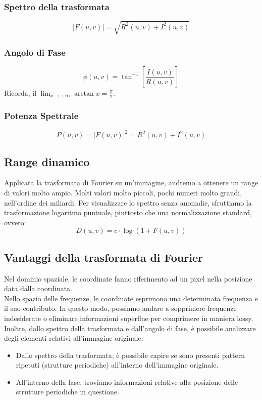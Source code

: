 \documentclass{report}
\begin{document}
	\subsubsection{Spettro della trasformata}
	$$
	|F(u,v)| = \sqrt{R^2(u,v)+I^2(u,v)}
	$$
	\subsubsection{Angolo di Fase}
	$$
	\phi(u,v) = \tan^{-1}\left[\frac{I(u,v)}{R(u,v)}\right]
	$$
	Ricorda, il $\lim_{x \to +\infty} \arctan{x}= \frac{\pi}{2}$.
	\subsubsection{Potenza Spettrale}
	$$
	P(u,v) = |F(u,v)|^2 = R^2(u,v) + I^2(u,v)
	$$
	
	
	\subsection{Range dinamico}
	Applicata la trasformata di Fourier su un'immagine, andremo a ottenere un range di valori molto ampio. Molti valori molto piccoli, pochi numeri molto grandi, nell'ordine dei miliardi. Per visualizzare lo spettro senza anomalie, sfruttiamo la trasformazione logaritmo puntuale, piuttosto che una normalizzazione standard, ovvero:
	$$
	D(u,v) = c\cdot\log(1+F(u,v))
	$$
	\subsection{Vantaggi della trasformata di Fourier}
	Nel dominio spaziale, le coordinate fanno riferimento ad un pixel nella posizione data dalla coordinata.\\
	Nello spazio delle frequenze, le coordinate esprimono una determinata frequenza e il suo contributo.
	In questo modo, possiamo andare a sopprimere frequenze indesiderate o eliminare informazioni superflue per comprimere in maniera lossy.
	Inoltre, dallo spettro della trasformata e dall'angolo di fase, è possibile analizzare degli elementi relativi all'immagine originale:
	\begin{itemize}
		\item Dallo spettro della trasformata, è possibile capire se sono presenti pattern ripetuti (strutture periodiche) all'interno dell'immagine originale.
		\item All'interno della fase, troviamo informazioni relative alla posizione delle strutture periodiche in questione.
	\end{itemize}
\end{document}
